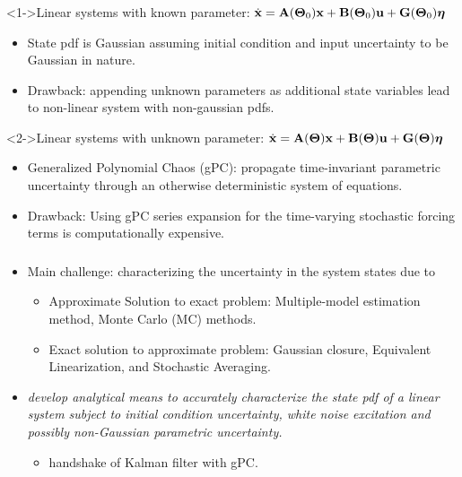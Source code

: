 \documentclass{beamer}
\begin{document}
\begin{frame}\frametitle{\color{black}{Introduction}}\framesubtitle{\color{white}{Problem Statement}}
\begin{block}<1->{Linear systems with known parameter: $\dot{\mathbf{x}} = \mathbf{A}(\boldsymbol{\Theta}_0)\mathbf{x} + \mathbf{B}(\boldsymbol{\Theta}_0)\mathbf{u}+ \mathbf{G}(\boldsymbol{\Theta}_0)\boldsymbol{\eta}$}
\begin{itemize}
\item State pdf is Gaussian assuming initial condition and input uncertainty to be Gaussian in nature.
\item \alert{Drawback:} appending unknown parameters as additional state variables lead to non-linear system with non-gaussian pdfs.
\end{itemize}
\end{block}

\begin{block}<2->{Linear systems with unknown parameter: $\dot{\mathbf{x}} = \mathbf{A}(\boldsymbol{\Theta})\mathbf{x} + \mathbf{B}(\boldsymbol{\Theta})\mathbf{u}+ \mathbf{G}(\boldsymbol{\Theta})\boldsymbol{\eta}$}
\begin{itemize}
\item Generalized Polynomial Chaos (gPC): propagate time-invariant parametric uncertainty through an otherwise deterministic system of equations.

\item \alert{Drawback:} Using gPC series expansion for the time-varying stochastic forcing terms is computationally expensive.
\end{itemize}
\end{block}

\end{frame}

\begin{frame}\frametitle{\color{black}{Introduction}}\framesubtitle{\color{white}{Motivation}}

\begin{itemize}
\item Main challenge: characterizing the uncertainty in the system states due to {}
\begin{itemize}
\item \alert{Approximate Solution to exact problem:} Multiple-model estimation method, Monte Carlo (MC) methods.
\item \alert{Exact solution to approximate problem:} Gaussian closure, Equivalent Linearization, and Stochastic Averaging.
\end{itemize}
\item<2-> {\color{blue}{Main Objective:}} \textit{develop analytical means to accurately characterize the state pdf of a linear system subject to initial condition uncertainty, white noise excitation and possibly non-Gaussian parametric uncertainty.}
\begin{itemize}
\item<2-> {\color{blue}{Uncertainty Marriage:}} \alert{handshake of Kalman filter with gPC.}
\end{itemize}

\end{itemize}
\end{frame}
\end{document}
